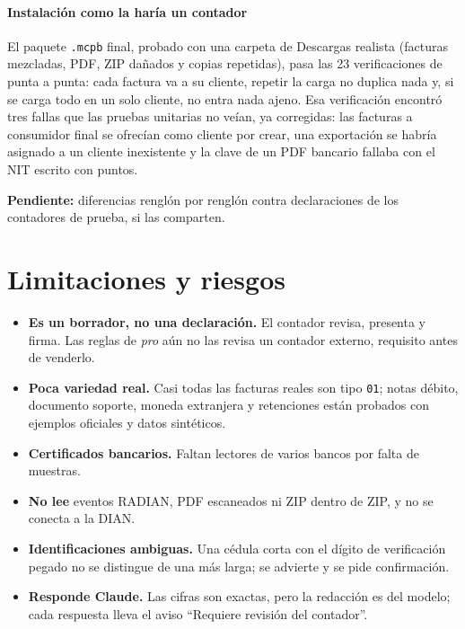 \documentclass[conference,a4paper]{IEEEtran}
\newcommand{\pendiente}[1]{\textcolor{red!70!black}{\textbf{Pendiente:} #1}}
\newcommand{\cod}[1]{\texttt{\small #1}}
\begin{document}
\paragraph*{Instalación como la haría un contador} El paquete \cod{.mcpb} final, probado con una carpeta de Descargas realista (facturas mezcladas, PDF, ZIP dañados y copias repetidas), pasa las 23 verificaciones de punta a punta: cada factura va a su cliente, repetir la carga no duplica nada y, si se carga todo en un solo cliente, no entra nada ajeno. Esa verificación encontró tres fallas que las pruebas unitarias no veían, ya corregidas: las facturas a consumidor final se ofrecían como cliente por crear, una exportación se habría asignado a un cliente inexistente y la clave de un PDF bancario fallaba con el NIT escrito con puntos.

\pendiente{diferencias renglón por renglón contra declaraciones de los contadores de prueba, si las comparten.}

\section{Limitaciones y riesgos}

\begin{itemize}
  \item \textbf{Es un borrador, no una declaración.} El contador revisa, presenta y firma. Las reglas de \emph{pro} aún no las revisa un contador externo, requisito antes de venderlo.
  \item \textbf{Poca variedad real.} Casi todas las facturas reales son tipo \cod{01}; notas débito, documento soporte, moneda extranjera y retenciones están probados con ejemplos oficiales y datos sintéticos.
  \item \textbf{Certificados bancarios.} Faltan lectores de varios bancos por falta de muestras.
  \item \textbf{No lee} eventos RADIAN, PDF escaneados ni ZIP dentro de ZIP, y no se conecta a la DIAN.
  \item \textbf{Identificaciones ambiguas.} Una cédula corta con el dígito de verificación pegado no se distingue de una más larga; se advierte y se pide confirmación.
  \item \textbf{Responde Claude.} Las cifras son exactas, pero la redacción es del modelo; cada respuesta lleva el aviso ``Requiere revisión del contador''.
\end{itemize}
\end{document}
